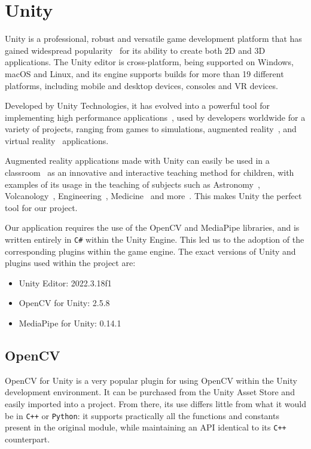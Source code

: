 \section{Unity}\label{sec:unity}
Unity is a professional, robust and versatile game development platform
that has gained widespread popularity~\cite{unity-technical-survey} for its ability to create both 2D and 3D applications.
The Unity editor is cross-platform, being supported on Windows, macOS and Linux, and its engine supports builds
for more than 19 different platforms, including mobile and desktop devices, consoles and VR devices.

Developed by Unity Technologies, it has evolved into a powerful tool for implementing
high performance applications~\cite{unity-interview-high-speed}, used by developers worldwide for a variety of projects,
ranging from games to simulations, augmented reality~\cite{marco-ar, marco-ar-mano},
and virtual reality~\cite{marco-vr} applications.

Augmented reality applications made with Unity can easily be used in a
classroom~\cite{ar-application-in-classroom-taxonomy, ar-for-preschool-children, vr-and-ar-for-learning, educational-ar}
as an innovative and interactive teaching method for children, with examples of its usage in the teaching of subjects such as
Astronomy~\cite{ar-astronomy}, Volcanology~\cite{ar-volcanology}, Engineering~\cite{ar-engineering},
Medicine~\cite{ar-medicine} and more~\cite{ar-microeconomics, ar-animals}.
This makes Unity the perfect tool for our project.

Our application requires the use of the OpenCV and MediaPipe libraries, and is written entirely in \texttt{C\#} within the Unity Engine.
This led us to the adoption of the corresponding plugins within the game engine.
The exact versions of Unity and plugins used within the project are:
\begin{itemize}
	\item Unity Editor: 2022.3.18f1
	\item OpenCV for Unity: 2.5.8
	\item MediaPipe for Unity: 0.14.1
\end{itemize}

\subsection{OpenCV}\label{subsec:opencv-for-unity}
OpenCV for Unity is a very popular plugin for using OpenCV within the Unity development environment.
It can be purchased from the Unity Asset Store and easily imported into a project.
From there, its use differs little from what it would be in \texttt{C++} or \texttt{Python}:
it supports practically all the functions and constants present in the original module,
while maintaining an API identical to its \texttt{C++} counterpart.

